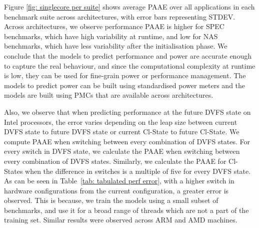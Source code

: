 Figure \ref{fig: singlecore per suite} shows average PAAE over all applications in each
benchmark suite across architectures, with error bars representing STDEV. Across
architectures, we observe performance PAAE is higher for SPEC benchmarks, which have high
variability at runtime, and low for NAS benchmarks, which have less variability after the
initialisation phase. We conclude that the models to predict performance and power are
accurate enough to capture the real behaviour, and since the computational complexity at
runtime is low, they can be used for fine-grain power or performance management. The
models to predict power can be built using standardised power meters and the models are
built using PMCs that are available across architectures.


\begin{table}[t]
    \centering
    \caption[PAAE over combinations of DVFS states and Cl-States using REPP.]{ PAAE when predicting performance for every combination of switch in DVFS state and for a specific set of differences when switching between Cl-States for a single-core Intel architecture. Similar results were observed across AMD, and ARM.}
    \label{tab: tabulated perf error}
\end{table}

 Also, we observe that when predicting performance at the future DVFS state
on Intel processors, the error varies depending on the leap size between current DVFS
state to future DVFS state or current Cl-State to future Cl-State.  We compute PAAE when
switching between every combination of DVFS states.  For every switch in DVFS state, we
calculate the PAAE when switching between every combination of DVFS states.  Similarly, we
calculate the PAAE for Cl-States when the difference in switches is a multiple of five for
every DVFS state.  As can be seen in Table~\ref{tab: tabulated perf error}, with a higher
switch in hardware configurations from the current configuration, a greater error is
observed. This is because, we train the models using a small subset of benchmarks, and use
it for a broad range of threads which are not a part of the training set. Similar results
were observed across ARM and AMD machines.


